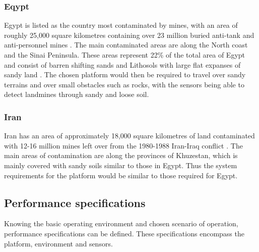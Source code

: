 \documentclass[main.tex]{subfiles}
\begin{document}
\subsubsection{Eqypt}
Egypt is listed as the country most contaminated by mines, with an area of roughly 25,000 square kilometres containing over 23 million buried anti-tank and anti-personnel mines \parencite{Rushfan2008}. The main contaminated areas are along the North coast and the Sinai Peninsula. These areas represent 22\% of the total area of Egypt and consist of barren shifting sands and Lithosols with large flat expanses of sandy land \parencite{Nahrawy2011}. The chosen platform would then be required to travel over sandy terrains and over small obstacles such as rocks, with the sensors being able to detect landmines through sandy and loose soil. 
 \subsubsection{Iran}
Iran has an area of approximately 18,000 square kilometres of land contaminated with 12-16 million mines left over from the 1980-1988 Iran-Iraq conflict \parencite{landmineMonitor2015}. The main areas of contamination are along the provinces of Khuzestan, which is mainly covered with sandy soils similar to those in Egypt. Thus the system requirements for the platform would be similar to those required for Egypt.

\subsection{Performance specifications}
Knowing the basic operating environment and chosen scenario of operation, performance specifications can be defined. These specifications encompass the platform, environment and sensors.
\end{document}
